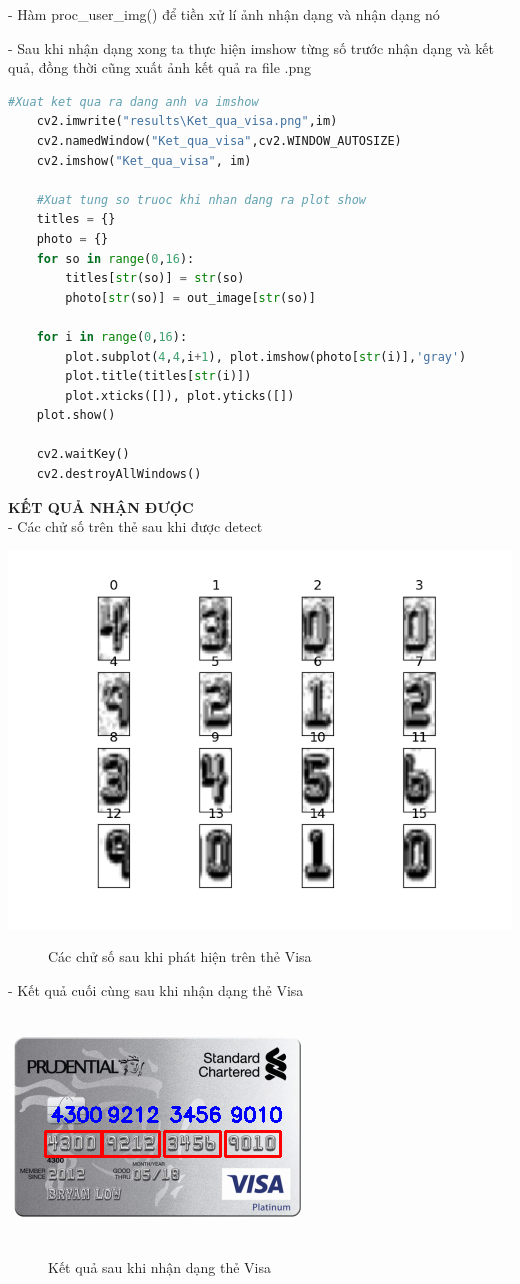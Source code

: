 - Hàm proc\_user\_img() để tiền xử lí ảnh nhận dạng và nhận dạng nó

- Sau khi nhận dạng xong ta thực hiện imshow từng số trước nhận dạng và kết quả, đồng thời cũng xuất ảnh kết quả ra file .png
\begin{lstlisting}[language=Python]
    #Xuat ket qua ra dang anh va imshow
    cv2.imwrite("results\Ket_qua_visa.png",im)
    cv2.namedWindow("Ket_qua_visa",cv2.WINDOW_AUTOSIZE)
    cv2.imshow("Ket_qua_visa", im)    

    #Xuat tung so truoc khi nhan dang ra plot show
    titles = {}
    photo = {}
    for so in range(0,16):		
        titles[str(so)] = str(so)
        photo[str(so)] = out_image[str(so)]

    for i in range(0,16):
	    plot.subplot(4,4,i+1), plot.imshow(photo[str(i)],'gray')
	    plot.title(titles[str(i)])
	    plot.xticks([]), plot.yticks([])
    plot.show()
    
    cv2.waitKey() 
    cv2.destroyAllWindows()          
\end{lstlisting}

\quad \textbf{KẾT QUẢ NHẬN ĐƯỢC} \\[0.2cm]

- Các chử số trên thẻ sau khi được detect 

\includegraphics[]{images/visa/digits.png}

\begin{figure}[htp!]
    \caption{Các chử số sau khi phát hiện trên thẻ Visa}
\end{figure}

- Kết quả cuối cùng sau khi nhận dạng thẻ Visa
\begin{center}
    \includegraphics[]{images/visa/ket_qua_visa.png}
\end{center}

\begin{figure}[htp!]
    \caption{Kết quả sau khi nhận dạng thẻ Visa}
\end{figure}